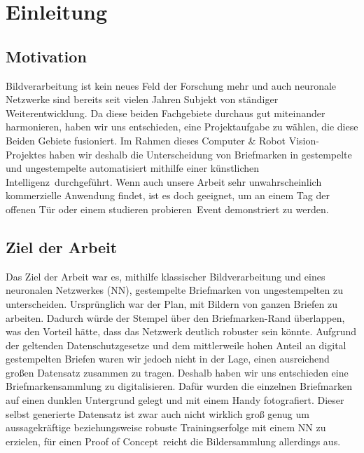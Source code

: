 \documentclass[12pt,toc=bib,toc=listof]{scrreprt}
\begin{document}
\chapter{Einleitung} %
\label{sec:einleitung}

\section{Motivation} %
\label{sec:motivation}
Bildverarbeitung ist kein neues Feld der Forschung mehr und auch neuronale Netzwerke sind bereits seit vielen Jahren Subjekt von ständiger Weiterentwicklung. Da diese beiden Fachgebiete durchaus gut miteinander harmonieren, haben wir uns entschieden, eine Projektaufgabe zu wählen, die diese Beiden Gebiete fusioniert. Im Rahmen dieses Computer \& Robot Vision-Projektes haben wir deshalb die Unterscheidung von Briefmarken in gestempelte und ungestempelte automatisiert mithilfe einer \dq künstlichen Intelligenz\dq\ durchgeführt. Wenn auch unsere Arbeit sehr unwahrscheinlich kommerzielle Anwendung findet, ist es doch geeignet, um an einem Tag der offenen Tür oder einem \dq studieren probieren\dq\ Event demonstriert zu werden.


\section{Ziel der Arbeit} %
\label{sec:ziel_der_arbeit}
Das Ziel der Arbeit war es, mithilfe klassischer Bildverarbeitung und eines neuronalen Netzwerkes (NN), gestempelte Briefmarken von ungestempelten zu unterscheiden. Ursprünglich war der Plan, mit Bildern von ganzen Briefen zu arbeiten. Dadurch würde der Stempel über den Briefmarken-Rand überlappen, was den Vorteil hätte, dass das Netzwerk deutlich robuster sein könnte. Aufgrund der geltenden Datenschutzgesetze und dem mittlerweile hohen Anteil an digital gestempelten Briefen waren wir jedoch nicht in der Lage, einen ausreichend großen Datensatz zusammen zu tragen. Deshalb haben wir uns entschieden eine Briefmarkensammlung zu digitalisieren. Dafür wurden die einzelnen Briefmarken auf einen dunklen Untergrund gelegt und mit einem Handy fotografiert.
Dieser selbst generierte Datensatz ist zwar auch nicht wirklich groß genug um aussagekräftige beziehungsweise robuste Trainingserfolge mit einem NN zu erzielen, für einen \dq Proof of Concept\dq\ reicht die Bildersammlung allerdings aus.

\newpage
\end{document}
